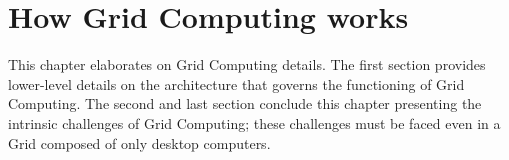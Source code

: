 \chapter{How Grid Computing works}\label{how_grid_computing_works}
This chapter elaborates on Grid Computing details. The first section provides lower-level details on the architecture that governs the functioning of Grid Computing. The second and last section conclude this chapter presenting the intrinsic challenges of Grid Computing; these challenges must be faced even in a Grid composed of only desktop computers.



